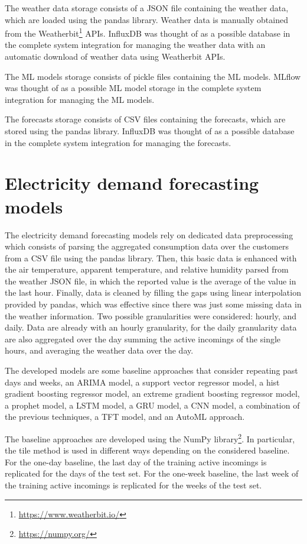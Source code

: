 The weather data storage consists of a JSON file containing the weather data, which are loaded using the pandas library.
Weather data is manually obtained from the Weatherbit\footnote{ \url{https://www.weatherbit.io/} } APIs.
InfluxDB was thought of as a possible database in the complete system integration for managing the weather data with an automatic download of weather data using Weatherbit APIs.

The ML models storage consists of pickle files containing the ML models.
MLflow was thought of as a possible ML model storage in the complete system integration for managing the ML models.

The forecasts storage consists of CSV files containing the forecasts, which are stored using the pandas library.
InfluxDB was thought of as a possible database in the complete system integration for managing the forecasts.


\section{Electricity demand forecasting models}
\label{sec:demandimpl}
\vspace{0.2 cm}

The electricity demand forecasting models rely on dedicated data preprocessing which consists of parsing the aggregated consumption data over the customers from a CSV file using the pandas library.
Then, this basic data is enhanced with the air temperature, apparent temperature, and relative humidity parsed from the weather JSON file, in which the reported value is the average of the value in the last hour.
Finally, data is cleaned by filling the gaps using linear interpolation provided by pandas, which was effective since there was just some missing data in the weather information.
Two possible granularities were considered: hourly, and daily.
Data are already with an hourly granularity, for the daily granularity data are also aggregated over the day summing the active incomings of the single hours, and averaging the weather data over the day.

The developed models are some baseline approaches that consider repeating past days and weeks, an ARIMA model, a support vector regressor model, a hist gradient boosting regressor model, an extreme gradient boosting regressor model, a prophet model, a LSTM model, a GRU model, a CNN model, a combination of the previous techniques, a TFT model, and an AutoML approach.

The baseline approaches are developed using the NumPy library\footnote{ \url{https://numpy.org/} }.
In particular, the tile method is used in different ways depending on the considered baseline.
For the one-day baseline, the last day of the training active incomings is replicated for the days of the test set.
For the one-week baseline, the last week of the training active incomings is replicated for the weeks of the test set.

